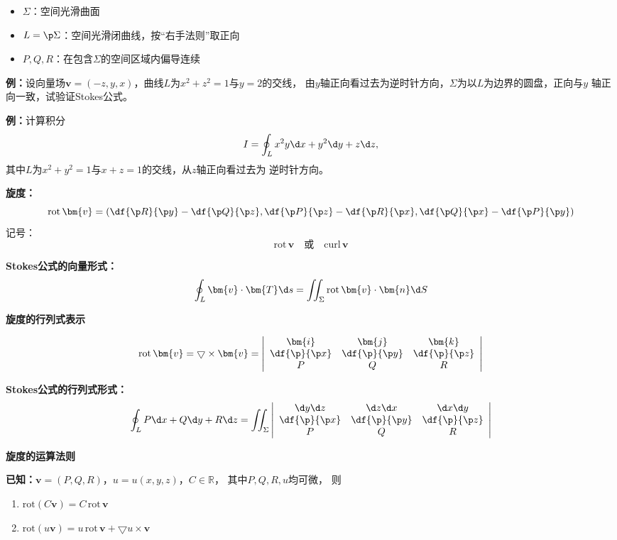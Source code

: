\begin{itemize}
  \item {$\Sigma$：}空间光滑曲面
  \item {$L=\p\Sigma$：}空间光滑闭曲线，按{“右手法则”}取正向
  \item {$P,Q,R$：}在包含$\Sigma$的空间区域内偏导连续
\end{itemize}

{\bf 例：}设向量场$\bm{v}=(-z,y,x)$，曲线$L$为$x^2+z^2=1$与$y=2$的交线，
由$y$轴正向看过去为逆时针方向，$\Sigma$为以$L$为边界的圆盘，正向与$y$
轴正向一致，试验证Stokes公式。

{\bf 例：}计算积分
$$I=\oint_Lx^2y\d x+y^2\d y+z\d z,$$
其中$L$为$x^2+y^2=1$与$x+z=1$的交线，从$z$轴正向看过去为
逆时针方向。

{\bf 旋度：}
$${\mathrm{rot}\,\bm{v}=\left(
\df{\p R}{\p y}-\df{\p Q}{\p z},
\df{\p P}{\p z}-\df{\p R}{\p x},
\df{\p Q}{\p x}-\df{\p P}{\p y}
\right)}$$ 
{记号：}
$$\mathrm{rot}\,\bm{v}\quad \mbox{或}\quad\mathrm{curl}\,\bm{v}$$ 

{\bf Stokes公式的向量形式：}
$${\oint_L\bm{v}\cdot\bm{T}\d s
=\iint_{\Sigma}\mathrm{rot}\,\bm{v}\cdot\bm{n}\d S}$$

{\bf 旋度的行列式表示}

$${\mathrm{rot}\,\bm{v}=\bigtriangledown\times\bm{v} 
=\left|\begin{array}{ccc}
	\bm{i} & \bm{j} & \bm{k}\\
	\df{\p}{\p x} & \df{\p}{\p y} & \df{\p}{\p z}\\
	P & Q & R
\end{array}\right|}$$ 

{\bf Stokes公式的行列式形式：} 
$${\oint_LP\d x+Q\d y+R\d z=\iint_{\Sigma}
\left|\begin{array}{ccc}
	\d y\d z & \d z\d x & \d x\d y\\
	\df{\p}{\p x} & \df{\p}{\p y} & \df{\p}{\p z}\\
	P & Q & R
\end{array}\right|}$$

{\bf 旋度的运算法则}

{\bf 已知：}$\bm{v}=(P,Q,R)$，$u=u(x,y,z)$，$C\in\mathbb{R}$， 
其中$P,Q,R,u$均可微， 则
\begin{enumerate}[(1)]
  \setlength{\itemindent}{1cm}
  \item ${\mathrm{rot}(C\bm{v}) =C\,\mathrm{rot}\,\bm{v}}$ 
  \item ${\mathrm{rot}(u\bm{v}) =u\,\mathrm{rot}\,\bm{v}
  +\bigtriangledown u\times\bm{v}}$
\end{enumerate}

